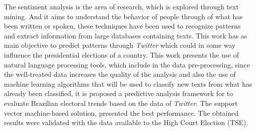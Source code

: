 The sentiment analysis is the area of ​​research, which is explored through
text mining. And it aims to understand the behavior of people through
of what has been written or spoken, these techniques have been used to recognize
patterns and extract information from large databases containing texts.
This work has as main objective to predict patterns through \textit {Twitter}
which could in some way influence the presidential elections of a country.
This work presents the use of natural language processing tools, which
include in the data pre-processing, since the well-treated data increases the quality of the analysis
and also the use of machine learning algorithms that will be used to classify
new texts from what has already been classified, it is proposed a predictive analysis framework for
to evaluate Brazilian electoral trends based on the data of \textit {Twitter}.
The support vector machine-based solution, presented the best performance. The obtained results
were validated with the data available to the High Court
Election (TSE).